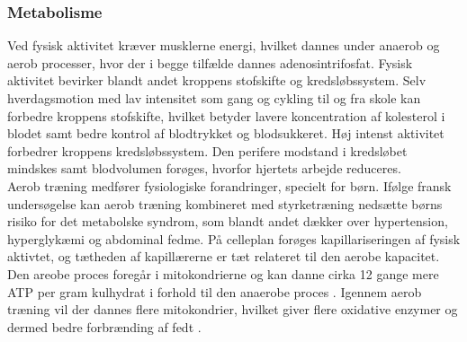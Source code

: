 \subsubsection{Metabolisme}
Ved fysisk aktivitet kræver musklerne energi, hvilket dannes under anaerob og aerob processer, hvor der i begge tilfælde dannes adenosintrifosfat. Fysisk aktivitet bevirker blandt andet kroppens stofskifte og kredsløbssystem. Selv hverdagsmotion med lav intensitet som gang og cykling til og fra skole kan forbedre kroppens stofskifte, hvilket betyder lavere koncentration af kolesterol i blodet samt bedre kontrol af blodtrykket og blodsukkeret. Høj intenst aktivitet forbedrer kroppens kredsløbssystem. Den perifere modstand i kredsløbet mindskes samt blodvolumen forøges, hvorfor hjertets arbejde reduceres. \citep{Kiens2007,Sundhedsstyrelsen2001} \\
Aerob træning medfører fysiologiske forandringer, specielt for børn. Ifølge fransk undersøgelse kan aerob træning kombineret med styrketræning nedsætte børns risiko for det metabolske syndrom, som blandt andet dækker over hypertension, hyperglykæmi og abdominal fedme. På celleplan forøges kapillariseringen af fysisk aktivtet, og tætheden af kapillærerne er tæt relateret til den aerobe kapacitet. \citep{Sundhedsstyrelsen2001,Guinhouya2009} Den areobe proces foregår i mitokondrierne og kan danne cirka 12 gange mere ATP per gram kulhydrat i forhold til den anaerobe proces \citep{Engelbreth2010,Stanfield2013}. Igennem aerob træning vil der dannes flere mitokondrier, hvilket giver flere oxidative enzymer og dermed bedre forbrænding af fedt \citep{Sundhedsstyrelsen2001}.